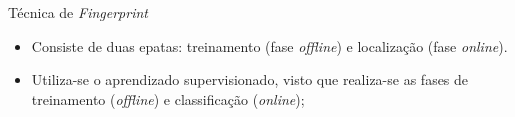 \documentclass[xcolor={dvipsnames,svgnames,table}]{beamer}
\begin{document}
\begin{frame}
\begin{block}{Técnica de \textit{Fingerprint}}
\begin{itemize}[label=\textcolor{black}{\textbullet}, left=5pt]
				\item Consiste de duas epatas: treinamento (fase \textit{offline}) e localização (fase \textit{online}).
				\item Utiliza-se o aprendizado supervisionado, visto que realiza-se as fases de treinamento (\textit{offline}) e classificação (\textit{online});
			\end{itemize}
		\end{block}
	\end{frame}

	\renewcommand{\arraystretch}{1.4}
	\addtolength{\tabcolsep}{1.5pt}
	
	
\end{document}
